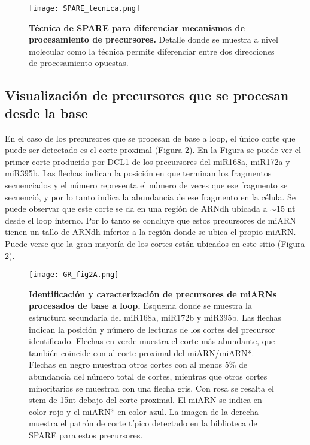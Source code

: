 \begin{figure}[htbp!] 
	\centering    
	\texttt{[image: SPARE\_tecnica.png]}
	\caption[Técnica de SPARE]{
        \textbf{Técnica de SPARE para diferenciar mecanismos de procesamiento de precursores.}
        Detalle donde se muestra a nivel molecular como la técnica permite diferenciar entre dos direcciones de procesamiento opuestas. 
    }
	 \label{fig:SPARE_tecnica}
\end{figure}

\subsection{Visualización de precursores que se procesan desde la base}

En el caso de los precursores que se procesan de base a loop, el único corte que puede ser detectado es el corte proximal (Figura \ref{fig:GR_fig2A}).
En la Figura se puede ver el primer corte producido por DCL1 de los precursores del miR168a, miR172a y miR395b.
Las flechas indican la posición en que terminan los fragmentos secuenciados y el número representa el número de veces que ese fragmento se secuenció, y por lo tanto indica la abundancia de ese fragmento en la célula.
Se puede observar que este corte se da en una región de ARNdh ubicada a $\sim$15 nt desde el loop interno.
Por lo tanto se concluye que estos precursores de miARN tienen un tallo de ARNdh inferior a la región donde se ubica el propio miARN.
Puede verse que la gran mayoría de los cortes están ubicados en este sitio (Figura \ref{fig:GR_fig2A}).

\begin{figure}[htbp!] 
    \centering    
    \texttt{[image: GR\_fig2A.png]}
    \caption[Identificación y caracterización de precursores de miARNs procesados de base a loop]{
    \textbf{Identificación y caracterización de precursores de miARNs procesados de base a loop.}
            Esquema donde se muestra la estructura secundaria del miR168a, miR172b y miR395b.
            Las flechas indican la posición y número de lecturas de los cortes del precursor identificado.
            Flechas en verde muestra el corte más abundante, que también coincide con al corte proximal del miARN/miARN*.
            Flechas en negro muestran otros cortes con al menos 5\% de abundancia del número total de cortes, mientras que otros cortes minoritarios se muestran con una flecha gris.
            Con rosa se resalta el stem de 15nt debajo del corte proximal.
            El miARN se indica en color rojo y el miARN* en color azul.
            La imagen de la derecha muestra el patrón de corte típico detectado en la biblioteca de SPARE para estos precursores.}
    \label{fig:GR_fig2A}
\end{figure}

